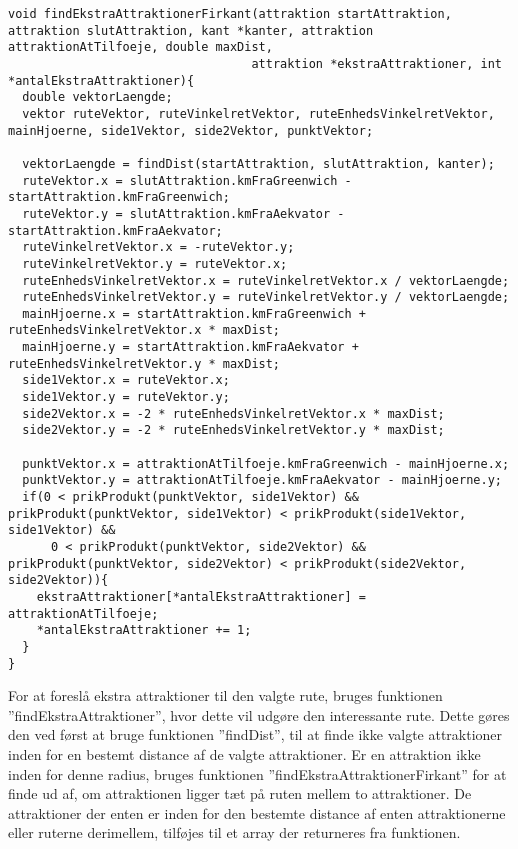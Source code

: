 \begin{lstlisting}
void findEkstraAttraktionerFirkant(attraktion startAttraktion, attraktion slutAttraktion, kant *kanter, attraktion attraktionAtTilfoeje, double maxDist, 
                                  attraktion *ekstraAttraktioner, int *antalEkstraAttraktioner){
  double vektorLaengde;
  vektor ruteVektor, ruteVinkelretVektor, ruteEnhedsVinkelretVektor, mainHjoerne, side1Vektor, side2Vektor, punktVektor;

  vektorLaengde = findDist(startAttraktion, slutAttraktion, kanter);
  ruteVektor.x = slutAttraktion.kmFraGreenwich - startAttraktion.kmFraGreenwich;
  ruteVektor.y = slutAttraktion.kmFraAekvator - startAttraktion.kmFraAekvator;
  ruteVinkelretVektor.x = -ruteVektor.y;
  ruteVinkelretVektor.y = ruteVektor.x;
  ruteEnhedsVinkelretVektor.x = ruteVinkelretVektor.x / vektorLaengde;
  ruteEnhedsVinkelretVektor.y = ruteVinkelretVektor.y / vektorLaengde;
  mainHjoerne.x = startAttraktion.kmFraGreenwich + ruteEnhedsVinkelretVektor.x * maxDist;
  mainHjoerne.y = startAttraktion.kmFraAekvator + ruteEnhedsVinkelretVektor.y * maxDist;
  side1Vektor.x = ruteVektor.x;
  side1Vektor.y = ruteVektor.y;
  side2Vektor.x = -2 * ruteEnhedsVinkelretVektor.x * maxDist;
  side2Vektor.y = -2 * ruteEnhedsVinkelretVektor.y * maxDist;

  punktVektor.x = attraktionAtTilfoeje.kmFraGreenwich - mainHjoerne.x;
  punktVektor.y = attraktionAtTilfoeje.kmFraAekvator - mainHjoerne.y;
  if(0 < prikProdukt(punktVektor, side1Vektor) && prikProdukt(punktVektor, side1Vektor) < prikProdukt(side1Vektor, side1Vektor) &&
      0 < prikProdukt(punktVektor, side2Vektor) && prikProdukt(punktVektor, side2Vektor) < prikProdukt(side2Vektor, side2Vektor)){
    ekstraAttraktioner[*antalEkstraAttraktioner] = attraktionAtTilfoeje;
    *antalEkstraAttraktioner += 1;
  }
}
\end{lstlisting}

For at foreslå ekstra attraktioner til den valgte rute, bruges funktionen ”findEkstraAttraktioner”, hvor dette vil udgøre den interessante rute. Dette gøres den ved først at bruge funktionen ”findDist”, til at finde ikke valgte attraktioner inden for en bestemt distance af de valgte attraktioner. Er en attraktion ikke inden for denne radius, bruges funktionen ”findEkstraAttraktionerFirkant” for at finde ud af, om attraktionen ligger tæt på ruten mellem to attraktioner. De attraktioner der enten er inden for den bestemte distance af enten attraktionerne eller ruterne derimellem, tilføjes til et array der returneres fra funktionen. \newline

